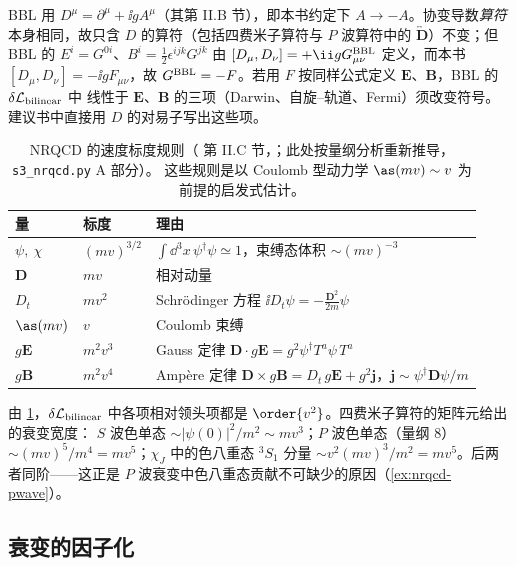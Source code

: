 \begin{remark}\label{rem:nrqcd-convention}
BBL 用 $D^\mu=\partial^\mu+\ii gA^\mu$（其第 II.B 节），即本书约定下 $A\to-A$。协变导数\emph{算符}本身相同，故只含 $D$ 的算符（包括四费米子算符与
$P$ 波算符中的 $\overleftrightarrow{\bm D}$）不变；但 BBL 的 $E^i=G^{0i}$、$B^i=\frac12\epsilon^{ijk}G^{jk}$ 由 $[D_\mu,D_\nu]=+\ii gG_{\mu\nu}^{\rm BBL}$
定义，而本书 $[D_\mu,D_\nu]=-\ii gF_{\mu\nu}$，故 $G^{\rm BBL}=-F$。若用 $F$ 按同样公式定义 $\bm E$、$\bm B$，BBL 的 $\delta\mathcal L_{\rm bilinear}$ 中
线性于 $\bm E$、$\bm B$ 的三项（Darwin、自旋–轨道、Fermi）须改变符号。建议书中直接用 $D$ 的对易子写出这些项。
\end{remark}

\begin{table}[htbp]
\centering
\small
\renewcommand{\arraystretch}{1.25}
\begin{tabular}{@{}lll@{}}
\toprule
量 & 标度 & 理由 \\
\midrule
$\psi,\ \chi$ & $(mv)^{3/2}$ & $\int\dd^3x\,\psi^\dagger\psi\simeq1$，束缚态体积 $\sim(mv)^{-3}$ \\
$\bm D$ & $mv$ & 相对动量 \\
$D_t$ & $mv^2$ & Schr\"odinger 方程 $\ii D_t\psi=-\frac{\bm D^2}{2m}\psi$ \\
$\as(mv)$ & $v$ & Coulomb 束缚 \\
$g\bm E$ & $m^2v^3$ & Gauss 定律 $\bm D\cdot g\bm E=g^2\psi^\dagger T^a\psi\,T^a$ \\
$g\bm B$ & $m^2v^4$ & Amp\`ere 定律 $\bm D\times g\bm B=D_t\,g\bm E+g^2\bm j$，$\bm j\sim\psi^\dagger\bm D\psi/m$ \\
\bottomrule
\end{tabular}
\caption{NRQCD 的速度标度规则（\cite{BodwinBraatenLepage1995} 第 II.C 节，\cite{LepageEtAl1992}；此处按量纲分析重新推导，\texttt{s3\_\allowbreak nrqcd.py} A 部分）。
这些规则是以 Coulomb 型动力学 $\as(mv)\sim v$ 为前提的启发式估计。}
\label{tab:nrqcd-velocity}
\end{table}

由 \cref{tab:nrqcd-velocity}，$\delta\mathcal L_{\rm bilinear}$ 中各项相对领头项都是 $\order{v^2}$。四费米子算符的矩阵元给出的衰变宽度：
$S$ 波色单态 $\sim|\psi(0)|^2/m^2\sim mv^3$；$P$ 波色单态（量纲 8）$\sim(mv)^5/m^4=mv^5$；$\chi_J$ 中的色八重态 $^3S_1$ 分量
$\sim v^2(mv)^3/m^2=mv^5$。后两者同阶——这正是 $P$ 波衰变中色八重态贡献不可缺少的原因（\cref{ex:nrqcd-pwave}）。

\subsection{衰变的因子化}

